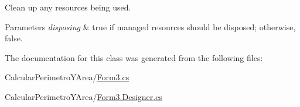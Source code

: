 Clean up any resources being used. 


\begin{DoxyParams}{Parameters}
{\em disposing} & true if managed resources should be disposed; otherwise, false.\\
\hline
\end{DoxyParams}


The documentation for this class was generated from the following files\+:\begin{DoxyCompactItemize}
\item 
Calcular\+Perimetro\+Y\+Area/\hyperlink{_form3_8cs}{Form3.\+cs}\item 
Calcular\+Perimetro\+Y\+Area/\hyperlink{_form3_8_designer_8cs}{Form3.\+Designer.\+cs}\end{DoxyCompactItemize}
